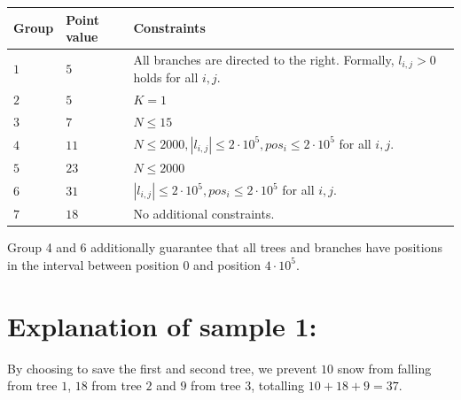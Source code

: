 \noindent
\begin{tabular}{| l | l | p{12cm} |}
  \hline
  \textbf{Group} & \textbf{Point value} & \textbf{Constraints} \\ \hline
  $1$    & $5$        & All branches are directed to the right. Formally, $l_{i,j} > 0$ holds for all $i,j$.  \\ \hline
  $2$    & $5$        & $K = 1$ \\ \hline
  $3$    & $7$        & $N \leq 15$ \\ \hline
  $4$    & $11$       & $N \leq 2000, |l_{i,j}| \leq 2 \cdot 10^5, pos_i \leq 2 \cdot 10^5$ for all $i,j$. \\ \hline %
  $5$    & $23$       & $N \leq 2000$  \\ \hline
  $6$    & $31$       & $ |l_{i,j}| \leq 2 \cdot 10^5, pos_i \leq 2 \cdot 10^5$ for all $i,j$. \\ \hline
  $7$    & $18$       & No additional constraints. \\ \hline
\end{tabular}

Group 4 and 6 additionally guarantee that all trees and branches have positions in the interval between position $0$ and position $4 \cdot 10^5$.


\section*{Explanation of sample 1:}
By choosing to save the first and second tree, we prevent $10$ snow from falling from tree $1$, $18$ from tree $2$ and $9$ from tree $3$,
totalling $10+18+9=37$.
